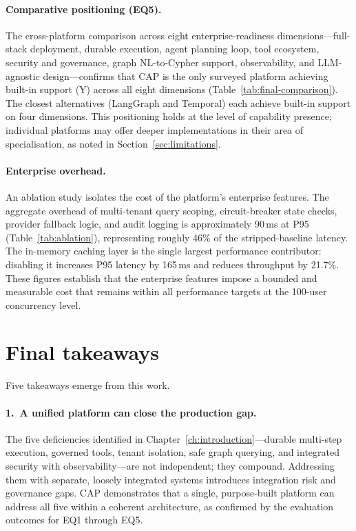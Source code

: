 \documentclass[a4paper,noexaminfo]{sapthesis}
\begin{document}
\paragraph{Comparative positioning (EQ5).}
The cross-platform comparison across eight enterprise-readiness
dimensions---full-stack deployment, durable execution, agent planning loop,
tool ecosystem, security and governance, graph NL-to-Cypher support,
observability, and LLM-agnostic design---confirms that CAP is the only
surveyed platform achieving built-in support (Y) across all eight
dimensions (Table~\ref{tab:final-comparison}).  The closest alternatives
(LangGraph and Temporal) each achieve built-in support on four dimensions.
This positioning holds at the level of capability presence; individual
platforms may offer deeper implementations in their area of specialisation,
as noted in Section~\ref{sec:limitations}.

\paragraph{Enterprise overhead.}
An ablation study isolates the cost of the platform's enterprise features.
The aggregate overhead of multi-tenant query scoping, circuit-breaker state
checks, provider fallback logic, and audit logging is approximately 90\,ms
at P95 (Table~\ref{tab:ablation}), representing roughly 46\% of the
stripped-baseline latency.  The in-memory caching layer is the single
largest performance contributor: disabling it increases P95 latency by
165\,ms and reduces throughput by 21.7\%.  These figures establish that the
enterprise features impose a bounded and measurable cost that remains
within all performance targets at the 100-user concurrency level.


\section{Final takeaways}
\label{sec:takeaways}

Five takeaways emerge from this work.

\paragraph{1.\ A unified platform can close the production gap.}
The five deficiencies identified in Chapter~\ref{ch:introduction}---durable
multi-step execution, governed tools, tenant isolation, safe graph
querying, and integrated security with observability---are not independent;
they compound.  Addressing them with separate, loosely integrated systems
introduces integration risk and governance gaps.  CAP demonstrates that a
single, purpose-built platform can address all five within a coherent
architecture, as confirmed by the evaluation outcomes for EQ1 through EQ5.
\end{document}

